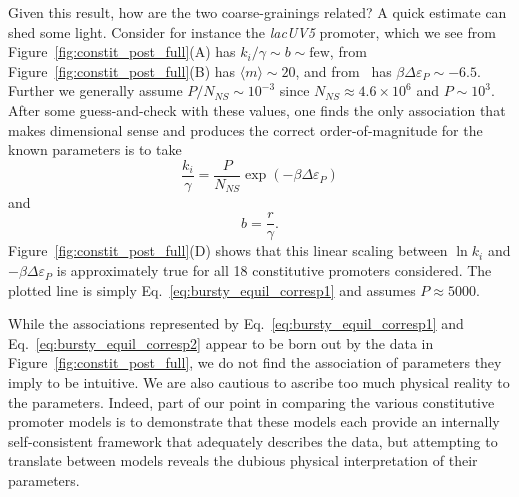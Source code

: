 Given this result, how are the two coarse-grainings related? A quick estimate
can shed some light. Consider for instance the \textit{lacUV5} promoter, which
we see from Figure~\ref{fig:constit_post_full}(A) has $k_i/\gamma \sim b \sim
\text{few}$, from Figure~\ref{fig:constit_post_full}(B) has $\langle m \rangle
\sim 20$, and from~\cite{Brewster2012} has $\beta\Delta\varepsilon_P \sim -
6.5$. Further we generally assume $P/N_{NS} \sim 10^{-3}$ since
$N_{NS}\approx4.6\times10^6$ and $P\sim10^3$. After some guess-and-check with
these values, one finds the only association that makes dimensional sense and
produces the correct order-of-magnitude for the known parameters is to take
\begin{equation}
\frac{k_i}{\gamma} = \frac{P}{N_{NS}} \exp(-\beta\Delta\varepsilon_P)
\label{eq:bursty_equil_corresp1}
\end{equation}
and
\begin{equation}
b = \frac{r}{\gamma}.
\label{eq:bursty_equil_corresp2}
\end{equation}
Figure~\ref{fig:constit_post_full}(D) shows that this linear scaling between
$\ln k_i$ and $-\beta\Delta\varepsilon_P$ is approximately true for all 18
constitutive promoters considered. The plotted line is simply
Eq.~\ref{eq:bursty_equil_corresp1} and assumes $P\approx 5000$.

While the associations represented by Eq.~\ref{eq:bursty_equil_corresp1} and
Eq.~\ref{eq:bursty_equil_corresp2} appear to be born out by the data in
Figure~\ref{fig:constit_post_full}, we do not find the association of parameters
they imply to be intuitive. We are also cautious to ascribe too much physical
reality to the parameters. Indeed, part of our point in comparing the various
constitutive promoter models is to demonstrate that these models each provide an
internally self-consistent framework that adequately describes the data, but
attempting to translate between models reveals the dubious physical
interpretation of their parameters.


